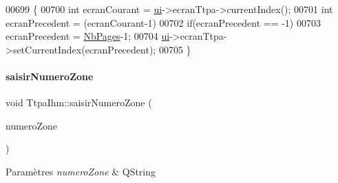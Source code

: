 \begin{DoxyCode}
00699 \{
00700     \textcolor{keywordtype}{int} ecranCourant = \hyperlink{class_ttpa_ihm_ad5fae1222a667da158c26f3d0f0dce23}{ui}->ecranTtpa->currentIndex();
00701     \textcolor{keywordtype}{int} ecranPrecedent = (ecranCourant-1)%
00702     \textcolor{keywordflow}{if}(ecranPrecedent == -1)
00703         ecranPrecedent = \hyperlink{class_ttpa_ihm_aad886f2c7b90b4f990492092f0be9c2ba66041bd2f2e100691c4d94c918e92956}{NbPages}-1;
00704     \hyperlink{class_ttpa_ihm_ad5fae1222a667da158c26f3d0f0dce23}{ui}->ecranTtpa->setCurrentIndex(ecranPrecedent);
00705 \}
\end{DoxyCode}
\mbox{\label{class_ttpa_ihm_a9b22616e3a4e52ad2ecfe1818d5fadb2}} 
\paragraph{\texorpdfstring{saisir\+Numero\+Zone}{saisirNumeroZone}}
{\footnotesize\ttfamily void Ttpa\+Ihm\+::saisir\+Numero\+Zone (\begin{DoxyParamCaption}\item[{const Q\+String}]{numero\+Zone }\end{DoxyParamCaption})\hspace{0.3cm}{\ttfamily [slot]}}


\begin{DoxyParams}{Paramètres}
{\em numero\+Zone} & Q\+String \\
\hline
\end{DoxyParams}


